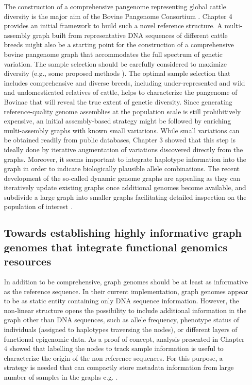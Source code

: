 \documentclass[../main.tex]{subfiles}
\begin{document}
The construction of a comprehensive pangenome representing global cattle diversity is the major aim of the Bovine Pangenome Consortium \citep{Smith2020}. Chapter 4 provides an initial framework to build such a novel reference structure. A multi-assembly graph built from representative DNA sequences of different cattle breeds might also be a starting point for the construction of a comprehensive bovine pangenome graph that accommodates the full spectrum of genetic variation. The sample selection should be carefully considered to maximize diversity (e.g., some proposed methods \citep{Ros-Freixedes2017,ranallo2021optimized}). The optimal sample selection that includes comprehensive and diverse breeds, including under-represented and wild and undomesticated relatives of cattle, helps to characterize the pangenome of Bovinae that will reveal the true extent of genetic diversity. Since generating reference-quality genome assemblies at the population scale is still prohibitively expensive, an initial assembly-based strategy might be followed by enriching multi-assembly graphs with known small variations. While small variations can be obtained readily from public databases, Chapter 3 showed that this step is ideally done by iterative augmentation of variations discovered directly from the graphs. Moreover, it seems important to integrate haplotype information into the graph in order to indicate biologically plausible allele combinations. The recent development of the so-called dynamic genome graphs are appealing as they can iteratively update existing graphs once additional genomes become available, and subdivide a large graph into smaller graphs facilitating detailed inspection on the population of interest \citep{eizenga2020efficient}.


\subsection*{Towards establishing highly informative graph genomes that integrate functional genomics resources}

In addition to be comprehensive, graph genomes should be at least as informative as the reference sequence. In their current implementation, graph genomes appear to be as static entity containing only DNA sequence information. However, the non-linear structure opens the possibility to include additional information in the graph other than DNA sequences, such as allele frequency, phenotype status of individuals (assigned to haplotypes traversing the nodes), or different layers of functional epigenomic data. As a proof of concept, analysis presented in Chapter 4 showed that labelling the nodes to track sample information is useful to characterize the origin of the non-reference sequences. For this purpose, a strategy is needed that can compactly store metadata information from large number of samples in the graphs e.g. \citet{siren2020haplotype}. 
\end{document}
